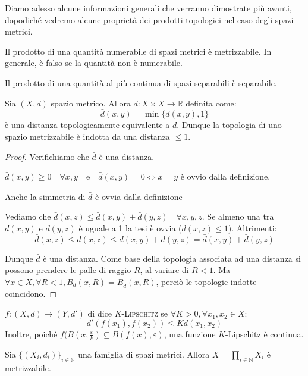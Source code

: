\documentclass{article}
\begin{document}
Diamo adesso alcune informazioni generali che verranno dimostrate più avanti, dopodiché vedremo alcune proprietà dei prodotti topologici nel caso degli spazi metrici. \\
\begin{nlist}
\item Il prodotto di una quantità numerabile di spazi metrici è metrizzabile. In generale, è falso se la quantità non è numerabile.
\item Il prodotto di una quantità al più continua di spazi separabili è separabile.
\end{nlist}
\begin{prop}
	Sia $(X,d)$ spazio metrico. Allora $\bar{d}:X \times X \longrightarrow \mathbb{R}$ definita come:
	$$\bar{d}(x,y)=\min \{d(x,y),1\}$$
	è una distanza topologicamente equivalente a $d$. Dunque la topologia di uno spazio metrizzabile è indotta da una distanza $\le 1$.
\end{prop}
\begin{proof}
	Verifichiamo che $\bar{d}$ è una distanza. \\
	\begin{nlist}
	\item $\bar{d}(x,y) \ge 0 \quad \forall x,y \quad \text{e} \quad \bar{d}(x,y)=0 \Leftrightarrow x=y$ è ovvio dalla definizione.
	\item Anche la simmetria di $\bar{d}$ è ovvia dalla definizione
	\item Vediamo che $\bar{d}(x,z) \le \bar{d}(x,y)+\bar{d}(y,z) \quad \forall x,y,z$. Se almeno una tra $\bar{d}(x,y)$ e $\bar{d}(y,z)$ è 				uguale a 1 la tesi è ovvia ($\bar{d}(x,z) \le 1$). Altrimenti:
	$$\bar{d}(x,z) \le d(x,z) \le d(x,y)+ d(y,z) =\bar{d}(x,y)+\bar{d}(y,z)$$
	\end{nlist}
	Dunque $\bar{d}$ è una distanza. Come base della topologia associata ad una distanza si possono prendere le palle di raggio $R$, al 			variare di $R<1$. Ma $\forall x \in X, \forall R<1, B_d(x,R)=B_{\bar{d}}(x,R)$, perciò le topologie indotte coincidono.
\end{proof}
\begin{defn}
	$f:(X,d) \longrightarrow (Y,d')$ di dice $K$-\textsc{Lipschitz} se $\forall K>0,\forall x_1,x_2 \in X$:
	$$d'(f(x_1),f(x_2)) \le Kd(x_1,x_2)$$
	Inoltre, poiché $f(B(x,\frac{\varepsilon}{k}) \subseteq B(f(x),\varepsilon)$, una funzione $K$-Lipschitz è continua.
\end{defn}
\begin{thm}
Sia $\{(X_i,d_i)\}_{i \in \mathbb{N}}$ una famiglia di spazi metrici. Allora $X=\prod _{i \in \mathbb{N}} X_i$ è metrizzabile.
\end{thm}
\end{document}

